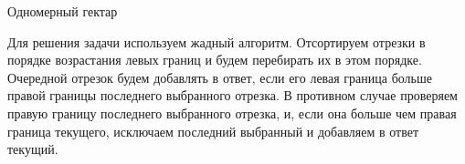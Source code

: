 \begin{tutorial}{Одномерный гектар}

Для решения задачи используем жадный алгоритм. Отсортируем отрезки в порядке возрастания левых границ и будем перебирать их в этом порядке. Очередной отрезок будем добавлять в ответ, если его левая граница больше правой границы последнего выбранного отрезка. В противном случае проверяем правую границу последнего выбранного отрезка, и, если она больше чем правая граница текущего, исключаем последний выбранный и добавляем в ответ текущий.

\end{tutorial}
